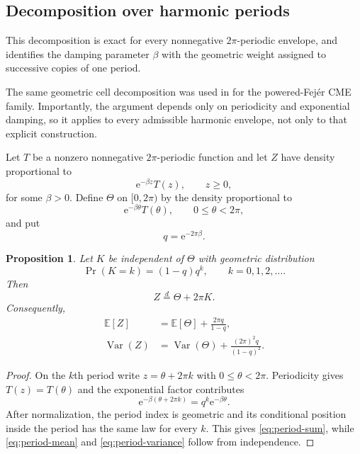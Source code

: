 \documentclass[11pt]{article}
\numberwithin{equation}{section}
\newtheorem{proposition}[theorem]{Proposition}
\theoremstyle{remark}
\newcommand{\E}{\mathbb E}
\newcommand{\Var}{\operatorname{Var}}
\newcommand{\e}{\mathrm e}
\begin{document}
\subsection{Decomposition over harmonic periods}

This decomposition is exact for every nonnegative $2\pi$-periodic envelope, and identifies the damping parameter $\beta$ with the geometric weight assigned to successive copies of one period.

The same geometric cell decomposition was used in \citet[Lemma~3 and equation~(12)]{BattagliolaPeralta2026OptFree} for the powered-Fej\'er CME family. Importantly, the argument depends only on periodicity and exponential damping, so it applies to every admissible harmonic envelope, not only to that explicit construction.

Let $T$ be a nonzero nonnegative $2\pi$-periodic function and let $Z$ have density proportional to
\[
  \e^{-\beta z}T(z),\qquad z\geq0,
\]
for some $\beta>0$. Define $\Theta$ on $[0,2\pi)$ by the density proportional to
\[
  \e^{-\beta\theta}T(\theta),
  \qquad 0\leq\theta<2\pi,
\]
and put
\[
  q=\e^{-2\pi \beta}.
\]

\begin{proposition}\label{prop:period-decomposition}
Let $K$ be independent of $\Theta$ with geometric distribution
\[
  \Pr(K=k)=(1-q)q^k,
  \qquad k=0,1,2,\ldots.
\]
Then
\begin{equation}\label{eq:period-sum}
  Z\stackrel d=\Theta+2\pi K.
\end{equation}
Consequently,
\begin{align}
  \E[Z]
  &=\E[\Theta]+\frac{2\pi q}{1-q},
  \label{eq:period-mean}\\
  \Var(Z)
  &=\Var(\Theta)+\frac{(2\pi)^2q}{(1-q)^2}.
  \label{eq:period-variance}
\end{align}
\end{proposition}

\begin{proof}
On the $k$th period write $z=\theta+2\pi k$ with $0\leq\theta<2\pi$. Periodicity gives $T(z)=T(\theta)$ and the exponential factor contributes
\[
  \e^{-\beta(\theta+2\pi k)}
  =q^k\e^{-\beta\theta}.
\]
After normalization, the period index is geometric and its conditional position inside the period has the same law for every $k$. This gives \eqref{eq:period-sum}, while \eqref{eq:period-mean} and \eqref{eq:period-variance} follow from independence.
\end{proof}
\end{document}
